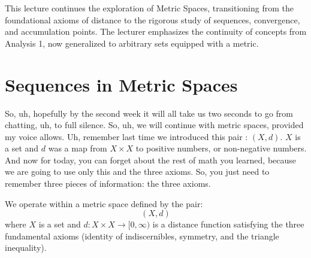 %



\begin{nice-box}[Context]
This lecture continues the exploration of Metric Spaces, transitioning from the foundational axioms of distance to the rigorous study of sequences, convergence, and accumulation points. The lecturer emphasizes the continuity of concepts from Analysis 1, now generalized to arbitrary sets equipped with a metric.
\end{nice-box}

\section{Sequences in Metric Spaces}

\begin{spoken-clean}[00:00:00 - 00:00:50]
So, uh, hopefully by the second week it will all take us two seconds to go from chatting, uh, to full silence. So, uh, we will continue with metric spaces, provided my voice allows. Uh, remember last time we introduced this pair : $(X, d)$. $X$ is a set and $d$ was a map from $X \times X$ to positive numbers, or non-negative numbers. And now for today, you can forget about the rest of math you learned, because we are going to use only this and the three axioms. So, you just need to remember three pieces of information: the three axioms.
\end{spoken-clean}

\begin{math-stroke}
We operate within a metric space defined by the pair:
\[ (X, d) \]
where $X$ is a set and $d: X \times X \to [0, \infty)$ is a distance function satisfying the three fundamental axioms (identity of indiscernibles, symmetry, and the triangle inequality).
\end{math-stroke}

